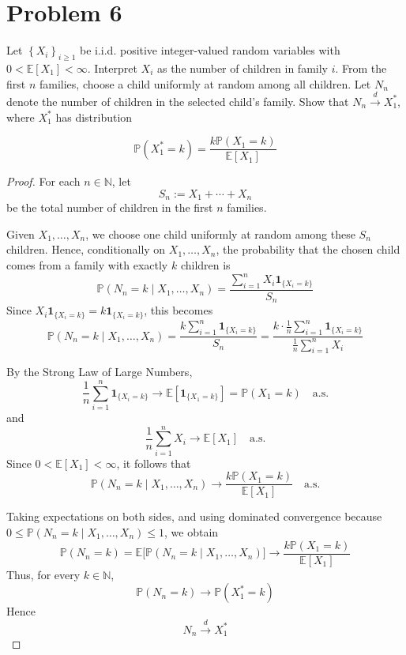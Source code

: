 \section*{Problem 6}
Let $\left\{X_i\right\}_{i \geq 1}$ be i.i.d. positive integer-valued random variables 
with $0<\mathbb{E}\left[X_1\right]<\infty$. 
Interpret $X_i$ as the number of children in family $i$. 
From the first $n$ families, choose a child uniformly at random among all children. 
Let $N_n$ denote the number of children in the selected child's family. 
Show that $N_n \xrightarrow{d} X_1^*$, where $X_1^*$ has distribution

$$
\mathbb{P}\left(X_1^*=k\right)=\frac{k \mathbb{P}\left(X_1=k\right)}{\mathbb{E}\left[X_1\right]}
$$


\begin{proof}
For each \(n\in\mathbb{N}\), let
\[
S_n:=X_1+\cdots+X_n
\]
be the total number of children in the first \(n\) families.

Given \(X_1,\dots,X_n\), we choose one child uniformly 
at random among these \(S_n\) children. 
Hence, conditionally on \(X_1,\dots,X_n\), 
the probability that the chosen child comes from a family 
with exactly \(k\) children is
\[
\mathbb{P}(N_n=k \mid X_1,\dots,X_n)
=
\frac{\sum_{i=1}^n X_i \mathbf{1}_{\{X_i=k\}}}{S_n}
\]
Since \(X_i \mathbf{1}_{\{X_i=k\}} = k \mathbf{1}_{\{X_i=k\}}\), this becomes
\[
\mathbb{P}(N_n=k \mid X_1,\dots,X_n)
=
\frac{k\sum_{i=1}^n \mathbf{1}_{\{X_i=k\}}}{S_n}
=
\frac{k \cdot \frac{1}{n}\sum_{i=1}^n \mathbf{1}_{\{X_i=k\}}}{\frac{1}{n}\sum_{i=1}^n X_i}
\]

By the Strong Law of Large Numbers,
\[
\frac{1}{n}\sum_{i=1}^n \mathbf{1}_{\{X_i=k\}}
\to \mathbb{E}[\mathbf{1}_{\{X_1=k\}}]
= \mathbb{P}(X_1=k)
\quad \text{a.s.}
\]
and
\[
\frac{1}{n}\sum_{i=1}^n X_i
\to \mathbb{E}[X_1]
\quad \text{a.s.}
\]
Since \(0<\mathbb{E}[X_1]<\infty\), it follows that
\[
\mathbb{P}(N_n=k \mid X_1,\dots,X_n)
\to
\frac{k\mathbb{P}(X_1=k)}{\mathbb{E}[X_1]}
\quad \text{a.s.}   
\]

Taking expectations on both sides, and using dominated convergence because
\(
0 \le \mathbb{P}(N_n=k \mid X_1,\dots,X_n)\le 1
\),
we obtain
\[
\mathbb{P}(N_n=k)
=
\mathbb{E}\big[\mathbb{P}(N_n=k \mid X_1,\dots,X_n)\big]
\to
\frac{k\mathbb{P}(X_1=k)}{\mathbb{E}[X_1]}
\]
Thus, for every \(k\in\mathbb{N}\),
\[
\mathbb{P}(N_n=k)\to \mathbb{P}(X_1^*=k)
\]
Hence
\[
N_n \xrightarrow{d} X_1^*
\]
\end{proof}